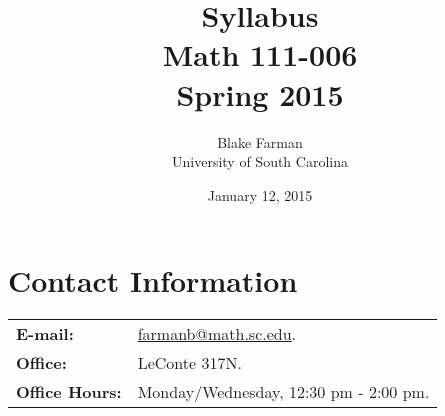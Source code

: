 \documentclass[10pt]{amsart}
\author{Blake Farman\\University of South Carolina}
\title{Syllabus\\Math 111-006\\Spring 2015}
\date{January 12, 2015}
\begin{document}
\maketitle

\section*{Contact Information}
\noindent
\begin{tabular}{p{1.4in}p{5in}}
  {\bf E-mail:} &\href{mailto:farmanb@math.sc.edu}{farmanb@math.sc.edu}.\\
  {\bf Office:} & LeConte 317N.\\
  {\bf Office Hours:} & Monday/Wednesday, 12:30 pm - 2:00 pm.\\
\end{tabular}
\end{document}
